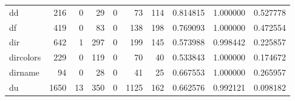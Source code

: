 \begin{longtable}{lrrrrrrrrr}
dd        &                                                216 &                                                  0 &                                                 29 &                                                  0 &                                                 73 &                                                114 &                                           0.814815 &                               1.000000 &                             0.527778 \\
df        &                                                419 &                                                  0 &                                                 83 &                                                  0 &                                                138 &                                                198 &                                           0.769093 &                               1.000000 &                             0.472554 \\
dir       &                                                642 &                                                  1 &                                                297 &                                                  0 &                                                199 &                                                145 &                                           0.573988 &                               0.998442 &                             0.225857 \\
dircolors &                                                229 &                                                  0 &                                                119 &                                                  0 &                                                 70 &                                                 40 &                                           0.533843 &                               1.000000 &                             0.174672 \\
dirname   &                                                 94 &                                                  0 &                                                 28 &                                                  0 &                                                 41 &                                                 25 &                                           0.667553 &                               1.000000 &                             0.265957 \\
du        &                                               1650 &                                                 13 &                                                350 &                                                  0 &                                               1125 &                                                162 &                                           0.662576 &                               0.992121 &                             0.098182 \\

\end{longtable}
